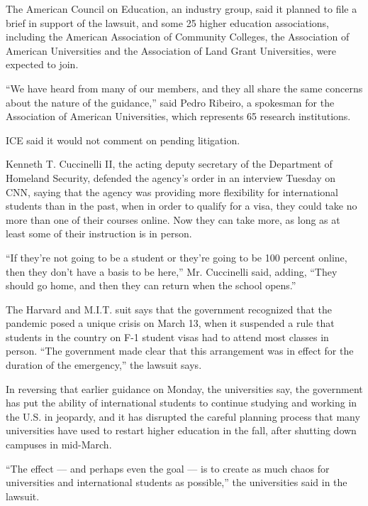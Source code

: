The American Council on Education, an industry group, said it planned to
file a brief in support of the lawsuit, and some 25 higher education
associations, including the American Association of Community Colleges,
the Association of American Universities and the Association of Land
Grant Universities, were expected to join.

``We have heard from many of our members, and they all share the same
concerns about the nature of the guidance,'' said Pedro Ribeiro, a
spokesman for the Association of American Universities, which represents
65 research institutions.

ICE said it would not comment on pending litigation.

Kenneth T. Cuccinelli II, the acting deputy secretary of the Department
of Homeland Security, defended the agency's order in an interview
Tuesday on CNN, saying that the agency was providing more flexibility
for international students than in the past, when in order to qualify
for a visa, they could take no more than one of their courses online.
Now they can take more, as long as at least some of their instruction is
in person.

``If they're not going to be a student or they're going to be 100
percent online, then they don't have a basis to be here,'' Mr.
Cuccinelli said, adding, ``They should go home, and then they can return
when the school opens.''

The Harvard and M.I.T. suit says that the government recognized that the
pandemic posed a unique crisis on March 13, when it suspended a rule
that students in the country on F-1 student visas had to attend most
classes in person. ``The government made clear that this arrangement was
in effect for the duration of the emergency,'' the lawsuit says.

In reversing that earlier guidance on Monday, the universities say, the
government has put the ability of international students to continue
studying and working in the U.S. in jeopardy, and it has disrupted the
careful planning process that many universities have used to restart
higher education in the fall, after shutting down campuses in mid-March.

``The effect --- and perhaps even the goal --- is to create as much
chaos for universities and international students as possible,'' the
universities said in the lawsuit.

\href{https://www.nytimes.com/news-event/coronavirus?action=click\&pgtype=Article\&state=default\&region=MAIN_CONTENT_3\&context=storylines_faq}{}


